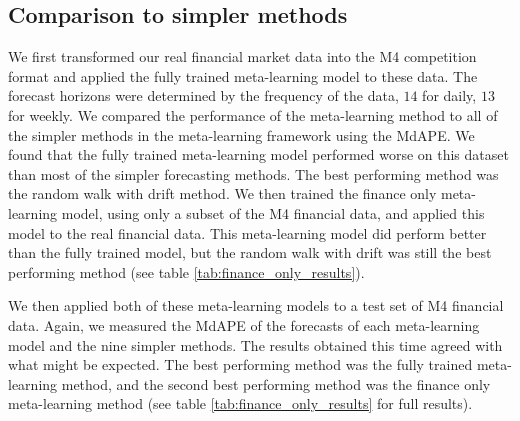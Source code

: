 \documentclass[a4paper,12pt]{article}
\theoremstyle{definition}
\begin{document}
\subsection{Comparison to simpler methods}
We first transformed our real financial market data into the M4 competition format and applied the fully trained meta-learning model to these data. The forecast horizons were determined by the frequency of the data, $14$ for daily, $13$ for weekly. We compared the performance of the meta-learning method to all of the simpler methods in the meta-learning framework using the MdAPE. We found that the fully trained meta-learning model performed worse on this dataset than most of the simpler forecasting methods. The best performing method was the random walk with drift method. We then trained the finance only meta-learning model, using only a subset of the M4 financial data, and applied this model to the real financial data. This meta-learning model did perform better than the fully trained model, but the random walk with drift was still the best performing method (see table \ref{tab:finance_only_results}).

We then applied both of these meta-learning models to a test set of M4 financial data. Again, we measured the MdAPE of the forecasts of each meta-learning model and the nine simpler methods. The results obtained this time agreed with what might be expected. The best performing method was the fully trained meta-learning method, and the second best performing method was the finance only meta-learning method (see table \ref{tab:finance_only_results} for full results).
\end{document}
